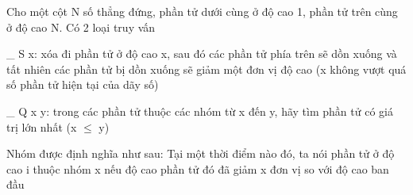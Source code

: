 Cho một cột N số thẳng đứng, phần tử dưới cùng ở độ cao 1, phần tử trên cùng ở độ cao N. Có 2 loại truy vấn   


   \_ S x: xóa đi phần tử ở độ cao x, sau đó các phần tử phía trên sẽ dồn xuống và tất nhiên các phần tử bị dồn xuống sẽ giảm một đơn vị độ cao (x không vượt quá số phần tử hiện tại của dãy số)   


   \_ Q x y: trong các phần tử thuộc các nhóm từ x đến y, hãy tìm phần tử có giá trị lớn nhất (x $\le$ y)   





   Nhóm được định nghĩa như sau: Tại một thời điểm nào đó, ta nói phần tử ở độ cao i thuộc nhóm x nếu độ cao phần tử đó đã giảm x đơn vị so với độ cao ban đầu